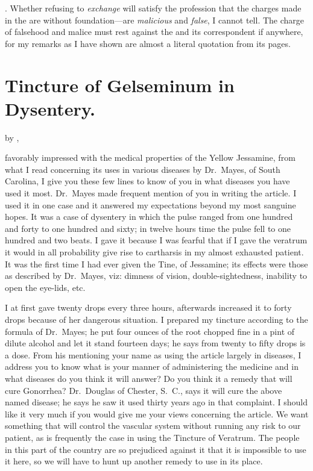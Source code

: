 . Whether refusing to \emph{exchange} will
satisfy the profession that the charges made in the  are without
foundation---are \emph{malicious} and \emph{false}, I cannot tell. The charge of falsehood
and malice must rest against the  and its correspondent
if anywhere, for my remarks as I have shown are almost a literal quotation
from its pages.

\section*{Tincture of Gelseminum in Dysentery.}

by , \md

 favorably impressed with the medical properties of the Yellow
Jessamine, from what I read concerning its uses in various diseases by
Dr.~Mayes, of South Carolina, I give you these few lines to know of
you in what diseases you have used it most. Dr.~Mayes made frequent
mention of you in writing the article. I used it in one case and it answered
my expectations beyond my most sanguine hopes. It was a case
of dysentery in which the pulse ranged from one hundred and forty to
one hundred and sixty; in twelve hours time the pulse fell to one hundred
and two beats. I gave it because I was fearful that if I gave the
veratrum it would in all probability give rise to cartharsis in my almost
exhausted patient. It was the first time I had ever given the Tine, of
Jessamine; its effects were those as described by Dr.~Mayes, viz: dimness
of vision, double-sightedness, inability to open the eye-lids, etc.

I at first gave twenty drops every three hours, afterwards increased it
to forty drops because of her dangerous situation. I prepared my tincture
according to the formula of Dr.~Mayes; he put four ounces of the
root chopped fine in a pint of dilute alcohol and let it stand fourteen days;
he says from twenty to fifty drops is a dose. From his mentioning your
name as using the article largely in diseases, I address you to know
what is your manner of administering the medicine and in what diseases
do you think it will answer? Do you think it a remedy that will
cure Gonorrhea? Dr.~Douglas of Chester, S.~C., says it will cure the above
named disease; he says he saw it used thirty years ago in that complaint.
I should like it very much if you would give me your views concerning
the article. We want something that will control the vascular system
without running any risk to our patient, as is frequently the case in
using the Tincture of Veratrum. The people in this part of the country
are so prejudiced against it that it is impossible to use it here, so we will
have to hunt up another remedy to use in its place.\endinput
